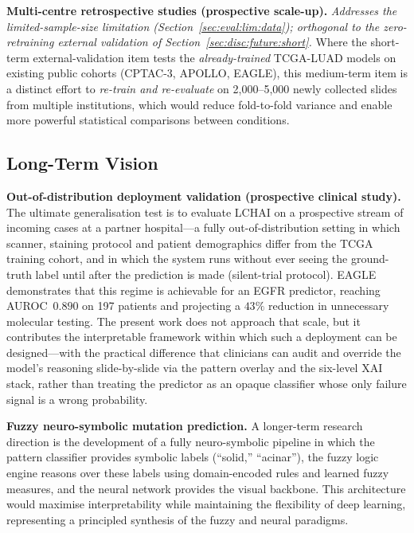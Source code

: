 \textbf{Multi-centre retrospective studies (prospective scale-up).}
\emph{Addresses the limited-sample-size limitation
(Section~\ref{sec:eval:lim:data}); orthogonal to the
zero-retraining external validation of
Section~\ref{sec:disc:future:short}.}
Where the short-term external-validation item tests the
\emph{already-trained} TCGA-LUAD models on existing public
cohorts (CPTAC-3, APOLLO, EAGLE), this medium-term item is a
distinct effort to \emph{re-train and re-evaluate} on
2{,}000--5{,}000 newly collected slides from multiple institutions,
which would reduce fold-to-fold variance and enable more powerful
statistical comparisons between conditions.


\subsection{Long-Term Vision}
\label{sec:disc:future:long}

\textbf{Out-of-distribution deployment validation (prospective
clinical study).}
The ultimate generalisation test is to evaluate LCHAI on a
prospective stream of incoming cases at a partner hospital---a
fully out-of-distribution setting in which scanner, staining
protocol and patient demographics differ from the TCGA
training cohort, and in which the system runs without ever
seeing the ground-truth label until after the prediction is
made (silent-trial protocol).
EAGLE~\cite{campanella2025eagle} demonstrates that this regime
is achievable for an EGFR predictor, reaching AUROC~$0.890$ on
197 patients and projecting a $43\%$ reduction in unnecessary
molecular testing.
The present work does not approach that scale, but it
contributes the interpretable framework within which such a
deployment can be designed---with the practical difference that
clinicians can audit and override the model's reasoning
slide-by-slide via the pattern overlay and the six-level XAI
stack, rather than treating the predictor as an opaque
classifier whose only failure signal is a wrong probability.

\textbf{Fuzzy neuro-symbolic mutation prediction.}
A longer-term research direction is the development of a fully neuro-symbolic pipeline in which the pattern classifier provides symbolic labels (``solid,'' ``acinar''), the fuzzy logic engine reasons over these labels using domain-encoded rules and learned fuzzy measures, and the neural network provides the visual backbone.
This architecture would maximise interpretability while maintaining the flexibility of deep learning, representing a principled synthesis of the fuzzy and neural paradigms.


